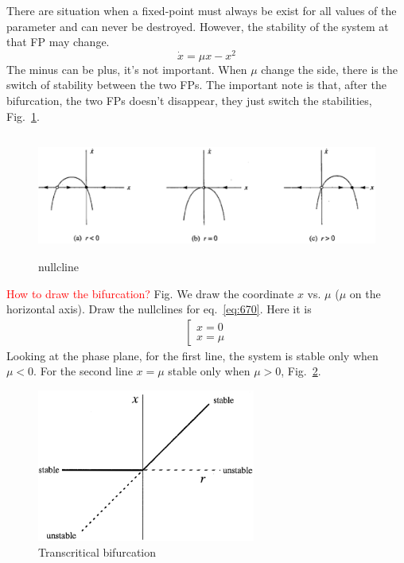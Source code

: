There are situation when a fixed-point must always be exist for all
values of the parameter and can never be destroyed. However, the
stability of the system at that FP may change.  
\begin{equation}
  \label{eq:670}
  \dot{x} = \mu x - x^2
\end{equation}
The minus can be plus, it's not important. When $\mu$ change the side,
there is the switch of stability between the two FPs. The important
note is that, after the bifurcation, the two FPs doesn't disappear,
they just switch the stabilities, Fig.~\ref{fig:transcritical}.

\begin{figure}[hbt]
  \centerline{\includegraphics[height=4cm,
    angle=0]{./images/transcritical_ex1.eps}}
\caption{nullcline}
\label{fig:transcritical}
\end{figure}

\textcolor{red}{How to draw the bifurcation?} Fig. We draw the
coordinate $x$ vs. $\mu$ ($\mu$ on the horizontal axis). Draw the
nullclines for eq.~\eqref{eq:670}. Here it is
\begin{equation}
  \label{eq:682}
  \begin{split}
    \left [
      \begin{array}{c}
        x = 0 \\
        x = \mu
      \end{array}
      \right.
  \end{split}
\end{equation}
Looking at the phase plane, for the first line, the system is stable
only when $\mu < 0$. For the second line $x=\mu$ stable only when
$\mu>0$, Fig.~\ref{fig:transcritical_bifur}.
\begin{figure}[hbt]
  \centerline{\includegraphics[height=5cm,
    angle=0]{./images/transcritical_bifur.eps}}
\caption{Transcritical bifurcation}
\label{fig:transcritical_bifur}
\end{figure}

